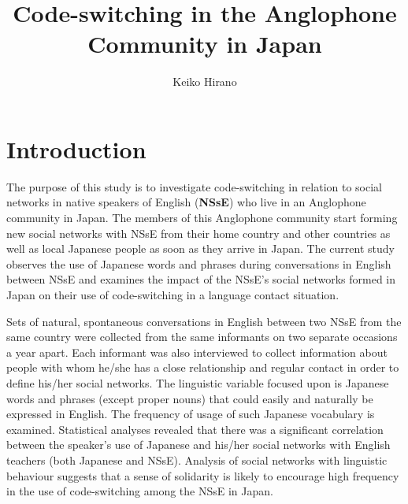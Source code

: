 \documentclass[output=paper]{LSP/langsci}
\author{Keiko Hirano\affiliation{University of Kitakyushu, Japan}}
\title{Code-switching in the Anglophone Community in Japan}
\begin{document}
   

 
\section{Introduction}
The purpose of this study is to investigate code-switching in relation to social networks in native speakers of English (\textbf{NSsE}) who live in an Anglophone community in Japan. The members of this Anglophone community start forming new social networks with NSsE from their home country and other countries as well as local Japanese people as soon as they arrive in Japan. The current study observes the use of Japanese words and phrases during conversations in English between NSsE and examines the impact of the NSsE’s social networks formed in Japan on their use of code-switching in a language contact situation.

Sets of natural, spontaneous conversations in English between two NSsE from the same country were collected from the same informants on two separate occasions a year apart. Each informant was also interviewed to collect information about people with whom he/she has a close relationship and regular contact in order to define his/her social networks. The linguistic variable focused upon is Japanese words and phrases (except proper nouns) that could easily and naturally be expressed in English. The frequency of usage of such Japanese vocabulary is examined. Statistical analyses revealed that there was a significant correlation between the speaker’s use of Japanese and his/her social networks with English teachers (both Japanese and NSsE). Analysis of social networks with linguistic behaviour suggests that a sense of solidarity is likely to encourage high frequency in the use of code-switching among the NSsE in Japan.
\end{document}
